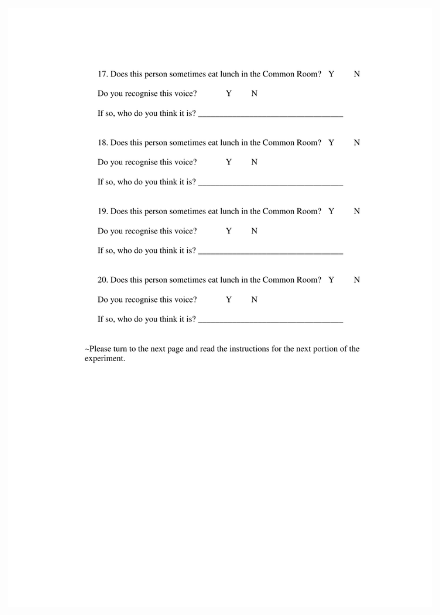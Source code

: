 \begin{figure}
	\centering
		\includegraphics[width=5in]{images/Exp3page4.pdf}
		\label{x3p4}
\end{figure}

